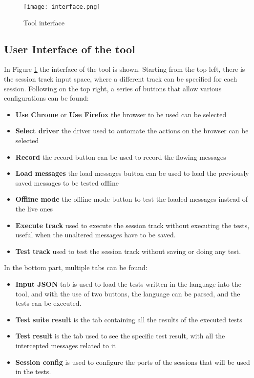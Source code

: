 \begin{figure}
    \texttt{[image: interface.png]}
    \caption{Tool interface}
    \label{fig:plugin_interface}
\end{figure}

\subsection{User Interface of the tool}
In Figure \ref{fig:plugin_interface} the interface of the tool is shown. Starting from the top left, there is the session track input space, where a different track can be specified for each session. Following on the top right, a series of buttons that allow various configurations can be found:
\begin{itemize}
    \item \textbf{Use Chrome} or \textbf{Use Firefox} the browser to be used can be selected
    \item \textbf{Select driver} the driver used to automate the actions on the browser can be selected
    \item \textbf{Record} the record button can be used to record the flowing messages
    \item \textbf{Load messages} the load messages button can be used to load the previously saved messages to be tested offline
    \item \textbf{Offline mode} the offline mode button to test the loaded messages instead of the live ones
    \item \textbf{Execute track} used to execute the session track without executing the tests, useful when the unaltered messages have to be saved.
    \item \textbf{Test track} used to test the session track without saving or doing any test.
\end{itemize}

In the bottom part, multiple tabs can be found:
\begin{itemize}
    \item \textbf{Input JSON} tab is used to load the tests written in the language into the tool, and with the use of two buttons, the language can be parsed, and the tests can be executed.
    \item \textbf{Test suite result} is the tab containing all the results of the executed tests
    \item \textbf{Test result} is the tab used to see the specific test result, with all the intercepted messages related to it
    \item \textbf{Session config} is used to configure the ports of the sessions that will be used in the tests.
\end{itemize}


